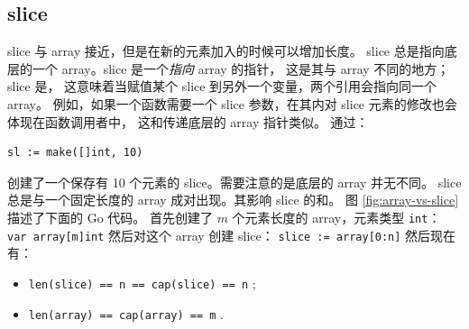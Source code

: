 \subsection{slice}
\label{sec:slices}
slice 与 array 接近，但是在新的元素加入的时候可以增加长度。
slice 总是指向底层的一个 array。slice 是一个\emph{指向} array 的指针，
这是其与 array 不同的地方；
slice 是，
这意味着当赋值某个 slice 到另外一个变量，两个引用会指向同一个 array。
例如，如果一个函数需要一个 slice 参数，在其内对 slice 元素的修改也会体现在函数调用者中，
这和传递底层的 array 指针类似。
通过：
\begin{lstlisting}
sl := make([]int, 10)
\end{lstlisting}
创建了一个保存有 10 个元素的 slice。需要注意的是底层的 array 并无不同。
slice 总是与一个固定长度的 array 成对出现。其影响 slice 
的和。
图 \ref{fig:array-vs-slice} 描述了下面的 Go 代码。
首先创建了 $m$ 个元素长度的 array，元素类型 \lstinline{int}：
\lstinline{var array[m]int}\newline
然后对这个 array 创建 slice：
\lstinline{slice := array[0:n]}\newline
然后现在有：
\begin{itemize}
\item{\lstinline{len(slice) == n == cap(slice) == n}{} ;}
\item{\lstinline{len(array) == cap(array) == m}{} .}
\end{itemize}
